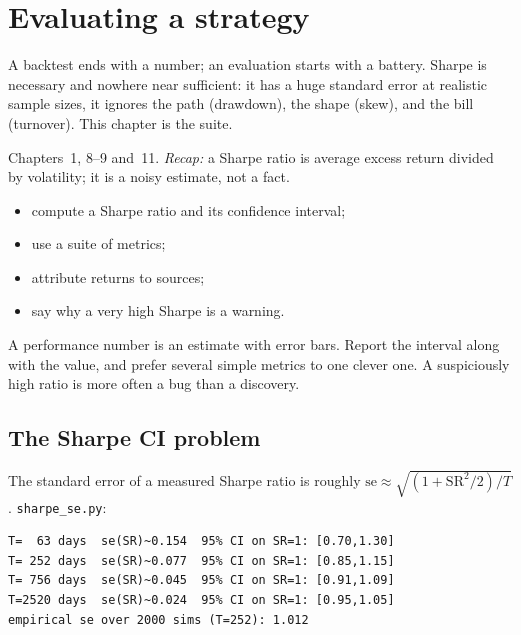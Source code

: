 \chapter{Evaluating a strategy}\label{ch:eval}

\noindent A backtest ends with a number; an evaluation starts with a battery. Sharpe is
necessary and nowhere near sufficient: it has a huge standard error at realistic sample
sizes, it ignores the path (drawdown), the shape (skew), and the bill (turnover). This
chapter is the suite.

\begin{rulebox}
Chapters~1, 8--9 and~11. \emph{Recap:} a Sharpe ratio is average excess return divided by volatility; it is a noisy estimate, not a fact.
\end{rulebox}
\begin{wins}
\begin{itemize}
\item compute a Sharpe ratio and its confidence interval;
\item use a suite of metrics;
\item attribute returns to sources;
\item say why a very high Sharpe is a warning.
\end{itemize}
\end{wins}
\begin{principle}
A performance number is an estimate with error bars. Report the interval along with the value, and prefer several simple metrics to one clever one. A suspiciously high ratio is more often a bug than a discovery.
\end{principle}

\section{The Sharpe CI problem}\label{sec:sharpeci}

The standard error of a measured Sharpe ratio is roughly
$\mathrm{se}\approx\sqrt{(1+\mathrm{SR}^2/2)/T}$. \texttt{sharpe\_se.py}:
\begin{lstlisting}[numbers=none]
T=  63 days  se(SR)~0.154  95% CI on SR=1: [0.70,1.30]
T= 252 days  se(SR)~0.077  95% CI on SR=1: [0.85,1.15]
T= 756 days  se(SR)~0.045  95% CI on SR=1: [0.91,1.09]
T=2520 days  se(SR)~0.024  95% CI on SR=1: [0.95,1.05]
empirical se over 2000 sims (T=252): 1.012
\end{lstlisting}

